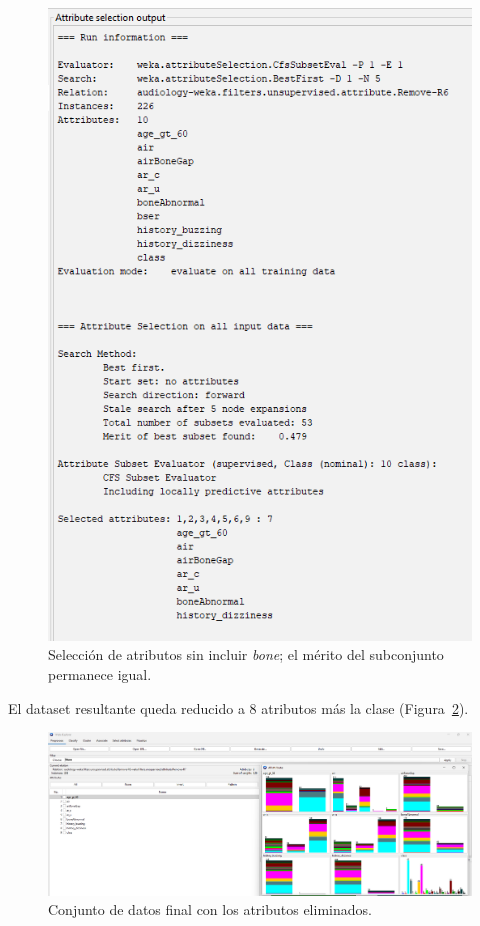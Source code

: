 \documentclass{article}
\begin{document}
\begin{figure}[!ht]
    \centering
    \includegraphics[width=0.8\linewidth]{Imágenes/reduced-attribute-search.png}
    \caption{Selección de atributos sin incluir \textit{bone}; el mérito del subconjunto permanece igual.}
    \label{fig:attribute-without-bone}
\end{figure}

El dataset resultante queda reducido a 8 atributos más la clase (Figura~\ref{fig:final-dataset}).

\begin{figure}[!ht]
    \centering
    \includegraphics[width=1\linewidth]{Imágenes/final_dataset.png}
    \caption{Conjunto de datos final con los atributos eliminados.}
    \label{fig:final-dataset}
\end{figure}
\end{document}
